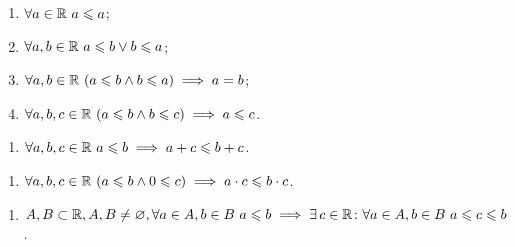 \documentclass[12pt]{article}
\begin{document}
\begin{axiom}
	\hfill
	\begin{center}
		\begin{minipage}{0.45\textwidth}
			\begin{enumerate}[itemsep=0pt, start=10]
				\item $\forall a\in \mathbb{R}\ a\leqslant a$;
				\item $\forall a, b\in \mathbb{R}\ a\leqslant b \lor b\leqslant a$;
				\item $\forall a, b\in \mathbb{R}\ (a\leqslant b \land b\leqslant a)\implies a=b$;
				\item $\forall a, b, c\in \mathbb{R}\ (a\leqslant b \land b\leqslant
					c)\implies a \leqslant c$.
			\end{enumerate}
		\end{minipage}
	\end{center}
\end{axiom}
\begin{axiom}
	\hfill
	\begin{center}
		\begin{minipage}{0.45\textwidth}
			\begin{enumerate}[itemsep=0pt, start=14]
				\item $\forall a, b, c\in \mathbb{R}\ a\leqslant b\implies a+c\leqslant b+c$.
			\end{enumerate}
		\end{minipage}
	\end{center}
\end{axiom}
\begin{axiom}
	\hfill
	\begin{center}
		\begin{minipage}{0.5\textwidth}
			\begin{enumerate}[itemsep=0pt, start=15]
				\item $\forall a, b, c\in \mathbb{R}\ (a\leqslant b \land 0\leqslant c)\implies a
					\cdot c\leqslant b\cdot c$.
			\end{enumerate}
		\end{minipage}
	\end{center}
\end{axiom}
\begin{axiom}
	\hfill
	\begin{center}
		\begin{minipage}{0.91\textwidth}
			\begin{enumerate}[itemsep=0pt, start=16]
				\item $A, B \subset \mathbb{R}, A, B \neq \varnothing, \forall
					a\in A, b\in B\ a\leqslant b\implies \exists\, c\in \mathbb{R}\colon \forall a\in
					A, b\in B\ a\leqslant c\leqslant b$.
			\end{enumerate}
		\end{minipage}
	\end{center}
\end{axiom}
\end{document}
